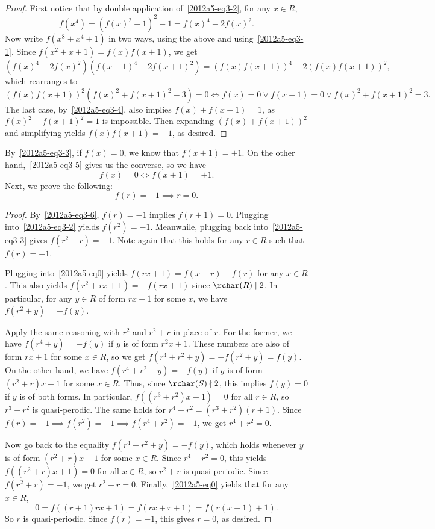 \begin{proof}
First notice that by double application of~\eqref{2012a5-eq3-2}, for any $x \in R$,
\[ f(x^4) = (f(x)^2 - 1)^2 - 1 = f(x)^4 - 2 f(x)^2. \]
Now write $f(x^8 + x^4 + 1)$ in two ways, using the above and using~\eqref{2012a5-eq3-1}.
Since $f(x^2 + x + 1) = f(x) f(x + 1)$, we get
\[ (f(x)^4 - 2 f(x)^2)(f(x + 1)^4 - 2 f(x + 1)^2) = (f(x) f(x + 1))^4 - 2 (f(x) f(x + 1))^2, \]
    which rearranges to
\[ (f(x) f(x + 1))^2 (f(x)^2 + f(x + 1)^2 - 3) = 0 \iff f(x) = 0 \vee f(x + 1) = 0 \vee f(x)^2 + f(x + 1)^2 = 3. \]
The last case, by~\eqref{2012a5-eq3-4}, also implies $f(x) + f(x + 1) = 1$, as $f(x)^2 + f(x + 1)^2 = 1$ is impossible.
Then expanding $(f(x) + f(x + 1))^2$ and simplifying yields $f(x) f(x + 1) = -1$, as desired.
\end{proof}

By~\eqref{2012a5-eq3-3}, if $f(x) = 0$, we know that $f(x + 1) = \pm 1$.
On the other hand,~\eqref{2012a5-eq3-5} gives us the converse, so we have
\[ f(x) = 0 \iff f(x + 1) = \pm 1. \tag{3.6}\label{2012a5-eq3-6} \]
Next, we prove the following:
\[ f(r) = -1 \implies r = 0. \tag{3.7}\label{2012a5-eq3-7} \]

\begin{proof}
By~\eqref{2012a5-eq3-6}, $f(r) = -1$ implies $f(r + 1) = 0$.
Plugging into~\eqref{2012a5-eq3-2} yields $f(r^2) = -1$.
Meanwhile, plugging back into~\eqref{2012a5-eq3-3} gives $f(r^2 + r) = -1$.
Note again that this holds for any $r \in R$ such that $f(r) = -1$.

Plugging into~\eqref{2012a5-eq0} yields $f(rx + 1) = f(x + r) - f(r)$ for any $x \in R$.
This also yields $f(r^2 + rx + 1) = -f(rx + 1)$ since $\rchar(R) \mid 2$.
In particular, for any $y \in R$ of form $rx + 1$ for some $x$, we have $f(r^2 + y) = -f(y)$.

Apply the same reasoning with $r^2$ and $r^2 + r$ in place of $r$.
For the former, we have $f(r^4 + y) = -f(y)$ if $y$ is of form $r^2 x + 1$.
These numbers are also of form $rx + 1$ for some $x \in R$, so we get $f(r^4 + r^2 + y) = -f(r^2 + y) = f(y)$.
On the other hand, we have $f(r^4 + r^2 + y) = -f(y)$ if $y$ is of form $(r^2 + r) x + 1$ for some $x \in R$.
Thus, since $\rchar(S) \nmid 2$, this implies $f(y) = 0$ if $y$ is of both forms.
In particular, $f((r^3 + r^2) x + 1) = 0$ for all $r \in R$, so $r^3 + r^2$ is quasi-perodic.
The same holds for $r^4 + r^2 = (r^3 + r^2)(r + 1)$.
Since $f(r) = -1 \implies f(r^2) = -1 \implies f(r^4 + r^2) = -1$, we get $r^4 + r^2 = 0$.

Now go back to the equality $f(r^4 + r^2 + y) = -f(y)$, which holds whenever $y$ is of form $(r^2 + r) x + 1$ for some $x \in R$.
Since $r^4 + r^2 = 0$, this yields $f((r^2 + r) x + 1) = 0$ for all $x \in R$, so $r^2 + r$ is quasi-periodic.
Since $f(r^2 + r) = -1$, we get $r^2 + r = 0$.
Finally,~\eqref{2012a5-eq0} yields that for any $x \in R$,
\[ 0 = f((r + 1)rx + 1) = f(rx + r + 1) = f(r(x + 1) + 1). \]
So $r$ is quasi-periodic.
Since $f(r) = -1$, this gives $r = 0$, as desired.
\end{proof}

